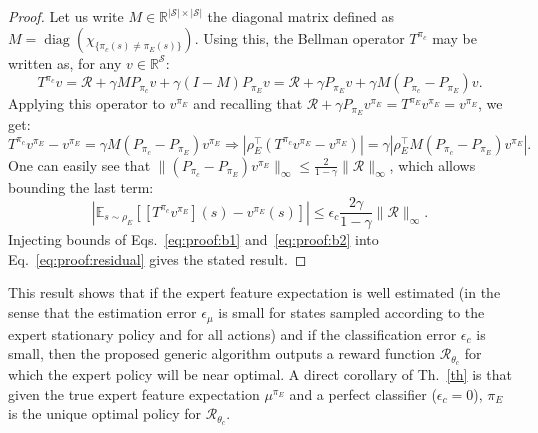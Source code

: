 \documentclass[english,utf8]{./hermes-journal}
\newcommand{\diag}{\operatorname*{diag}}
\newcommand{\R}{\mathcal{R}}
\newcommand{\s}{\mathcal{S}}
\newcommand{\E}{\mathbb{E}}
\begin{document}
\begin{proof}
  Let us write $M\in\mathbb{R}^{|\s|\times |\s|}$ the diagonal matrix
  defined as $M = \diag (\chi_{\{\pi_c(s)\neq\pi_E(s)\}})$. Using
  this, the Bellman operator $T^{\pi_c}$ may be written as, for any $v\in\mathbb{R}^\s$:
  \begin{equation}
    T^{\pi_c}v = \R + \gamma M P_{\pi_c} v + \gamma (I-M)P_{\pi_E} v
    = \R + \gamma P_{\pi_E} v + \gamma M (P_{\pi_c}-P_{\pi_E})v.
  \end{equation}
  Applying this operator to $v^{\pi_E}$ and recalling that $\R +
  \gamma P_{\pi_E} v^{\pi_E} = T^{\pi_E} v^{\pi_E} = v^{\pi_E}$, we
  get:
  \begin{equation}
    T^{\pi_c}v^{\pi_E} - v^{\pi_E} = \gamma M
    (P_{\pi_c}-P_{\pi_E})v^{\pi_E}
    \Rightarrow |\rho_E^\top (T^{\pi_c}v^{\pi_E} - v^{\pi_E})| = \gamma
    |\rho_E^\top M (P_{\pi_c}-P_{\pi_E})v^{\pi_E}|.
  \end{equation}
  One can easily see that $\|(P_{\pi_c}-P_{\pi_E})v^{\pi_E}\|_\infty
  \leq \frac{2}{1-\gamma}\|\R\|_\infty$, which allows bounding the
  last term:
  \begin{equation}
    |\E_{s\sim\rho_E}[[T^{\pi_c}v^{\pi_E}](s) - v^{\pi_E}(s)]| \leq
    \epsilon_c \frac{2\gamma}{1-\gamma} \|\R\|_\infty.
    \label{eq:proof:b2}
  \end{equation}
  Injecting bounds of Eqs.~\eqref{eq:proof:b1}
  and~\eqref{eq:proof:b2} into Eq.~\eqref{eq:proof:residual} gives the
  stated result.%
\end{proof}

This result shows that if the expert feature expectation is well
estimated (in the sense that the estimation error $\epsilon_\mu$ is
small for states sampled according to the expert stationary policy
and for all actions) and if the classification error $\epsilon_c$ is
small, then the proposed generic algorithm outputs a reward function
$\R_{\theta_c}$ for which the expert policy will be near optimal. A
direct corollary of Th.~\ref{th} is that given the true expert
feature expectation $\mu^{\pi_E}$ and a perfect classifier
($\epsilon_c=0$), $\pi_E$ is the unique optimal policy for
$\R_{\theta_c}$.
\end{document}

